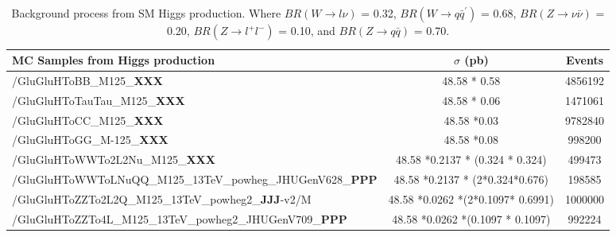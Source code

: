 \begin{table}
\caption{ Background process from SM Higgs production. Where $BR(W\rightarrow l\nu)$ = 0.32,
    $BR(W\rightarrow q\bar{q}^\prime)$ = 0.68, $BR(Z\rightarrow \nu\bar{\nu})$ = 0.20,
$BR(Z\rightarrow l^+l^-)$ = 0.10, and $BR(Z\rightarrow q\bar{q})$ = 0.70.} 
\label{tab:mcSampleHiggsBkg}
\centering
\begin{adjustbox}{max width=\textwidth}
 \begin{tabular}{lcc} \hline                                                           
\hline 
  {\bf{MC Samples from Higgs production}} & {\bf{$\sigma$}} (pb) & {\bf{Events}}\\\hline\hline
 /GluGluHToBB\_M125\_{\bf{XXX}}                                      & 48.58 * 0.58                &4856192   \\
 /GluGluHToTauTau\_M125\_{\bf{XXX}}                                  & 48.58 * 0.06                            &1471061   \\
 /GluGluHToCC\_M125\_{\bf{XXX}}                                      & 48.58 *0.03                            &9782840   \\
 /GluGluHToGG\_M-125\_{\bf{XXX}}                                     & 48.58 *0.08                            &998200    \\
 /GluGluHToWWTo2L2Nu\_M125\_{\bf{XXX}}                               & 48.58 *0.2137 * (0.324 * 0.324)        &499473    \\
 /GluGluHToWWToLNuQQ\_M125\_13TeV\_powheg\_JHUGenV628\_{\bf{PPP}}                   & 48.58 *0.2137 * (2*0.324*0.676)        &198585    \\
 /GluGluHToZZTo2L2Q\_M125\_13TeV\_powheg2\_{\bf{JJJ}}-v2/M                & 48.58 *0.0262 *(2*0.1097* 0.6991)      &1000000   \\
 /GluGluHToZZTo4L\_M125\_13TeV\_powheg2\_JHUGenV709\_{\bf{PPP}}                     & 48.58 *0.0262 *(0.1097 * 0.1097)       &992224    \\\hline
                                                                                                                                                   

\end{tabular}
\end{adjustbox}
\end{table}
